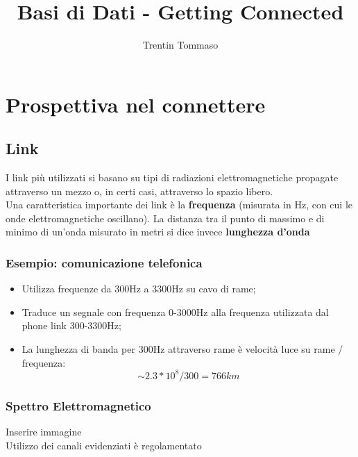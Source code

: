 \documentclass{article}
\title{Basi di Dati - Getting Connected}
\author{Trentin Tommaso}
\begin{document}
    \maketitle
    \tableofcontents
    \newpage

    \section{Prospettiva nel connettere}
      \subsection{Link}
        I link più utilizzati si basano su tipi di radiazioni elettromagnetiche propagate attraverso un mezzo o, in certi casi, attraverso lo spazio libero. \\
        Una caratteristica importante dei link è la \textbf{frequenza} (misurata in Hz, con cui le onde elettromagnetiche oscillano). La distanza tra il punto di massimo e di minimo di un'onda misurato in metri si dice invece \textbf{lunghezza d'onda} \\
        \subsubsection{Esempio: comunicazione telefonica}
          \begin{itemize}
            \item Utilizza frequenze da 300Hz a 3300Hz su cavo di rame;
            \item Traduce un segnale con frequenza 0-3000Hz alla frequenza utilizzata dal phone link 300-3300Hz;
            \item La lunghezza di banda per 300Hz attraverso rame è velocità luce su rame / frequenza: $$\sim 2.3*10^8/300=766km$$
          \end{itemize}
        \subsubsection{Spettro Elettromagnetico}
          Inserire immagine \\
          Utilizzo dei canali evidenziati è regolamentato \\
\end{document}
